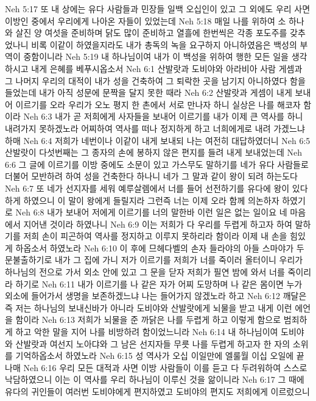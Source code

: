 Neh 5:17  또 내 상에는 유다 사람들과 민장들 일백 오십인이 있고 그 외에도 우리 사면 이방인 중에서 우리에게 나아온 자들이 있었는데
Neh 5:18  매일 나를 위하여 소 하나와 살진 양 여섯을 준비하며 닭도 많이 준비하고 열흘에 한번씩은 각종 포도주를 갖추었나니 비록 이같이 하였을지라도 내가 총독의 녹을 요구하지 아니하였음은 백성의 부역이 중함이니라
Neh 5:19  내 하나님이여 내가 이 백성을 위하여 행한 모든 일을 생각하시고 내게 은혜를 베푸시옵소서
Neh 6:1  산발랏과 도비야와 아라비아 사람 게셈과 그 나머지 우리의 대적이 내가 성을 건축하여 그 퇴락한 곳을 남기지 아니하였다 함을 들었는데 내가 아직 성문에 문짝을 달지 못한 때라
Neh 6:2  산발랏과 게셈이 내게 보내어 이르기를 오라 우리가 오노 평지 한 촌에서 서로 만나자 하니 실상은 나를 해코자 함이라
Neh 6:3  내가 곧 저희에게 사자들을 보내어 이르기를 내가 이제 큰 역사를 하니 내려가지 못하겠노라 어찌하여 역사를 떠나 정지하게 하고 너희에게로 내려 가겠느냐 하매
Neh 6:4  저희가 네번이나 이같이 내게 보내되 나는 여전히 대답하였더니
Neh 6:5  산발랏이 다섯번째는 그 종자의 손에 봉하지 않은 편지를 들려 내게 보내었는데
Neh 6:6  그 글에 이르기를 이방 중에도 소문이 있고 가스무도 말하기를 네가 유다 사람들로 더불어 모반하려 하여 성을 건축한다 하나니 네가 그 말과 같이 왕이 되려 하는도다
Neh 6:7  또 네가 선지자를 세워 예루살렘에서 너를 들어 선전하기를 유다에 왕이 있다 하게 하였으니 이 말이 왕에게 들릴지라 그런즉 너는 이제 오라 함께 의논하자 하였기로
Neh 6:8  내가 보내어 저에게 이르기를 너의 말한바 이런 일은 없는 일이요 네 마음에서 지어낸 것이라 하였나니
Neh 6:9  이는 저희가 다 우리를 두렵게 하고자 하여 말하기를 저희 손이 피곤하여 역사를 정지하고 이루지 못하리라 함이라 이제 내 손을 힘있게 하옵소서 하였노라
Neh 6:10  이 후에 므헤다벨의 손자 들라야의 아들 스마야가 두문불출하기로 내가 그 집에 가니 저가 이르기를 저희가 너를 죽이러 올터이니 우리가 하나님의 전으로 가서 외소 안에 있고 그 문을 닫자 저희가 필연 밤에 와서 너를 죽이리라 하기로
Neh 6:11  내가 이르기를 나 같은 자가 어찌 도망하며 나 같은 몸이면 누가 외소에 들어가서 생명을 보존하겠느냐 나는 들어가지 않겠노라 하고
Neh 6:12  깨달은즉 저는 하나님의 보내신바가 아니라 도비야와 산발랏에게 뇌물을 받고 내게 이런 에언을 함이라
Neh 6:13  저희가 뇌물을 준 까닭은 나를 두렵게 하고 이렇게 함으로 범죄하게 하고 악한 말을 지어 나를 비방하려 함이었느니라
Neh 6:14  내 하나님이여 도비야와 산발랏과 여선지 노아댜와 그 남은 선지자들 무릇 나를 두렵게 하고자 한 자의 소위를 기억하옵소서 하였노라
Neh 6:15  성 역사가 오십 이일만에 엘룰월 이십 오일에 끝나매
Neh 6:16  우리 모든 대적과 사면 이방 사람들이 이를 듣고 다 두려워하여 스스로 낙담하였으니 이는 이 역사를 우리 하나님이 이루신 것을 앎이니라
Neh 6:17  그 때에 유다의 귀인들이 여러번 도비야에게 편지하였고 도비야의 편지도 저희에게 이르렀으니
